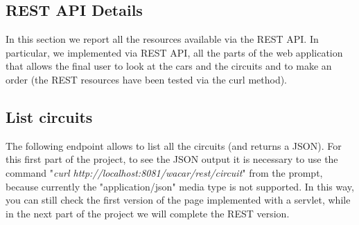 \subsection{REST API Details}

In this section we report all the resources available via the REST API. In particular, we implemented via REST API, all the parts of the web application that allows the final user to look at the cars and the circuits and to make an order (the REST resources have been tested via the curl method).

\subsection*{List circuits}

The following endpoint allows to list all the circuits (and returns a JSON). For this first part of the project, to see the JSON output it is necessary to use the command "\textit{curl http://localhost:8081/wacar/rest/circuit}" from the prompt, because currently the "application/json" media type is not supported. In this way, you can still check the first version of the page implemented with a servlet, while in the next part of the project we will complete the REST version.

